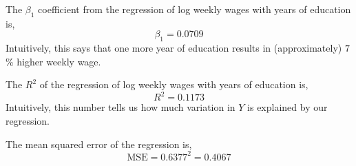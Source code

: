 \documentclass[12pt,twoside]{article}
\begin{document}
\begin{problems}
\problem  %

\begin{problemparts}

\problempart  %

The $\beta_1$ coefficient from the regression of log weekly wages with years of education
is,
$$ \boxed{\beta_1 = 0.0709} $$
Intuitively, this says that one more year of education results in (approximately) $7$\%
higher weekly wage.

\problempart  %

The $R^2$ of the regression of log weekly wages with years of education is,
$$ \boxed{R^2 = 0.1173} $$
Intuitively, this number tells us how much variation in $Y$ is explained by our regression.

\problempart  %

The mean squared error of the regression is,
$$ \boxed{\mathrm{MSE} = 0.6377^2 = 0.4067} $$

\end{problemparts}

\end{problems}
\end{document}
